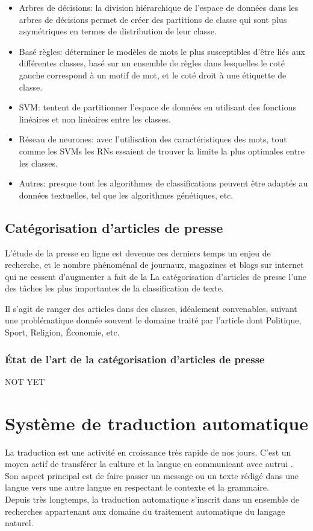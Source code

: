     \begin{itemize}
        \item Arbres de décisions: la division hiérarchique de l'espace de données dans les arbres de décisions permet de créer des partitions de classe qui sont plus asymétriques en termes de distribution de leur classe.

        \item Basé règles: déterminer le modèles de mots le plus susceptibles d'être liés aux différentes classes, basé sur un ensemble de règles dans lesquelles le coté gauche correspond à un motif de mot, et le coté droit à une étiquette de classe.

        \item SVM: tentent de partitionner l'espace de données en utilisant des fonctions linéaires et non linéaires entre les classes.

        \item Réseau de neurones: avec l'utilisation des caractéristiques des mots, tout comme les SVMs les RNs essaient de trouver la limite la plus optimales entre les classes.

        \item Autres: presque tout les algorithmes de classifications peuvent être adaptés au données textuelles, tel que les algorithmes génétiques, etc.
    \end{itemize}


    \subsection{Catégorisation d'articles de presse}
    L’étude de la presse en ligne est devenue ces derniers temps un enjeu de recherche, et le nombre phénoménal de journaux, magazines et blogs sur internet qui ne cessent d'augmenter a fait de la La catégorisation d'articles de presse l'une des tâches les plus importantes de la classification de texte.

    Il s'agit de ranger des articles dans des classes, idéalement convenables, suivant une problématique donnée souvent le domaine traité par l'article dont Politique, Sport, Religion, Économie, etc.

    \subsubsection{État de l'art de la catégorisation d'articles de presse}
    NOT YET

\section{Système de traduction automatique}
La traduction est une activité en croissance très rapide de nos jours\cite{tradstat}. C'est un moyen actif de transférer la culture et la langue en communicant avec autrui \cite{tradcom}. Son aspect principal est de faire passer un message ou un texte rédigé dans une langue vers une autre langue en respectant le contexte et la grammaire.\\
Depuis très longtemps, la traduction automatique s'inscrit dans un ensemble de recherches appartenant aux domaine du traitement automatique du langage naturel.
